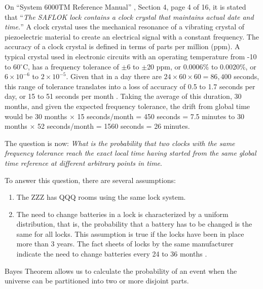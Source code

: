 \documentclass[12pt,reqno]{amsart}
\begin{document}
On ``System 6000TM Reference Manual'' \cite{SAFLOCK6000}, Section 4, page 4 of 16, it is stated that ``\textit{The SAFLOK lock contains a clock crystal that maintains actual date and time.}'' %
A clock crystal uses the mechanical resonance of a vibrating crystal of piezoelectric material to create an electrical signal with a constant frequency. The accuracy of a clock crystal is defined in terms of parts per million (ppm). A typical crystal used in electronic circuits with an operating temperature from -10 to 60$^{\circ}$C, has a  frequency tolerance of $\pm$6 to $\pm$20 ppm, or 0.0006\% to 0.0020\%, or $6 \times 10^{-6}$ to $2 \times 10^{-5}$. Given that in a day there are $24 \times 60 \times 60 = 86,400$ seconds, this range of tolerance translates into a loss of accuracy of 0.5 to 1.7 seconds per day, or 15 to 51 seconds per month \cite{vig1992introduction, lombardi2008accuracy}.  Taking the average of this duration, 30 months, and given the expected frequency tolerance, the drift from global time would be 30 months $\times$ 15 seconds/month = 450 seconds = 7.5 minutes to  30 months $\times$ 52 seconds/month = 1560 seconds = 26 minutes.

The question is now: \textit{What is the probability that two clocks with the same frequency tolerance reach the exact local time having started from the same global time reference at different arbitrary points in time}. 

To answer this question, there are several assumptions: 

\begin{enumerate}
	\item The ZZZ has QQQ rooms using the same lock system. 
	\item The need to change batteries in a lock is characterized by a uniform distribution, that is, the probability that a battery has to be changed is the same for all locks. This assumption is true if the locks have been in place more than 3 years. The fact sheets of locks by the same manufacturer indicate the need to change batteries every 24 to 36 months \cite{saflok770Series, saflok790Series, saflokQuantumPixel, saflokMTRFID,  saflokQuantumIV, saflokRTPlus}.
\end{enumerate}


Bayes Theorem allows us to calculate the probability of an event when
the universe can be partitioned into two or more disjoint parts.
\end{document}
